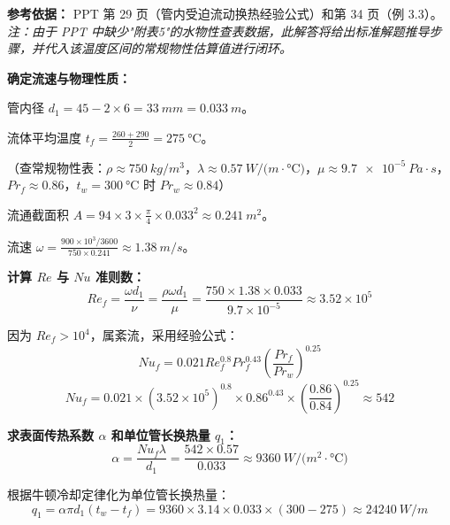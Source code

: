 \begin{solution}
\textbf{参考依据：} PPT 第 29 页（管内受迫流动换热经验公式）和第 34 页（例 3.3）。\textit{注：由于 PPT 中缺少"附表5"的水物性查表数据，此解答将给出标准解题推导步骤，并代入该温度区间的常规物性估算值进行闭环。}

\textbf{确定流速与物理性质：}

管内径 \(d_1 = 45 - 2 \times 6 = \qty{33}{mm} = \qty{0.033}{m}\)。

流体平均温度 \(t_f = \frac{260 + 290}{2} = \qty{275}{\degreeCelsius}\)。

（查常规物性表：\(\rho \approx \qty{750}{kg/m^3}\)，\(\lambda \approx \qty{0.57}{W/(m\cdot\degreeCelsius)}\)，\(\mu \approx \qty{9.7e-5}{Pa\cdot s}\)，\(Pr_f \approx 0.86\)，\(t_w = \qty{300}{\degreeCelsius}\) 时 \(Pr_w \approx 0.84\)）

流通截面积 \(A = 94 \times 3 \times \frac{\pi}{4} \times 0.033^2 \approx \qty{0.241}{m^2}\)。

流速 \(\omega = \frac{900 \times 10^3 / 3600}{750 \times 0.241} \approx \qty{1.38}{m/s}\)。

\textbf{计算 \(Re\) 与 \(Nu\) 准则数：}
\begin{equation*}
  Re_f = \frac{\omega d_1}{\nu} = \frac{\rho \omega d_1}{\mu} = \frac{750 \times 1.38 \times 0.033}{9.7 \times 10^{-5}} \approx 3.52 \times 10^5
\end{equation*}

因为 \(Re_f > 10^4\)，属紊流，采用经验公式：
\begin{equation*}
  Nu_f = 0.021 Re_f^{0.8} Pr_f^{0.43}\left(\frac{Pr_f}{Pr_w}\right)^{0.25}
\end{equation*}
\begin{equation*}
  Nu_f = 0.021 \times (3.52 \times 10^5)^{0.8} \times 0.86^{0.43} \times \left(\frac{0.86}{0.84}\right)^{0.25} \approx 542
\end{equation*}

\textbf{求表面传热系数 \(\alpha\) 和单位管长换热量 \(q_1\)：}
\begin{equation*}
  \alpha = \frac{Nu_f \lambda}{d_1} = \frac{542 \times 0.57}{0.033} \approx \qty{9360}{W/(m^2\cdot\degreeCelsius)}
\end{equation*}

根据牛顿冷却定律化为单位管长换热量：
\begin{equation*}
  q_1 = \alpha \pi d_1 (t_w - t_f) = 9360 \times 3.14 \times 0.033 \times (300 - 275) \approx \qty{24240}{W/m}
\end{equation*}
\end{solution}

